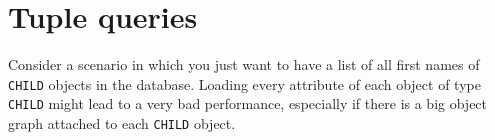 \documentclass[a4paper,12pt]{report}
\begin{document}
%
%
%
%
%
%	
%
%
%
%
%
%
%

\chapter{Tuple queries}

Consider a scenario in which you just want to have a list of all first names of \lstinline !CHILD! objects in the database. 
Loading every attribute of each object of type \lstinline!CHILD! might lead to a very bad performance, especially if there is a big object graph attached to each \lstinline!CHILD! object.
\end{document}
